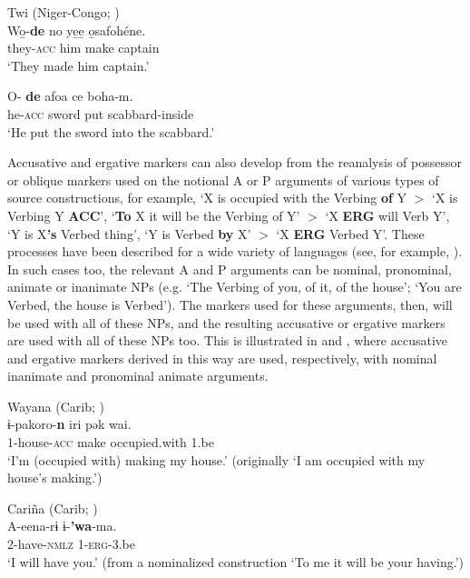 \documentclass[output=paper]{langsci/langscibook}
\begin{document}
\ea\label{twi}
Twi (Niger-Congo; )\\
\ea
\gll Wo̱-\textbf{{de}} no ye̱e̱ o̱safohéne.\\
they-\textsc{acc} him make captain\\
\glt `They made him captain.' 

\ex
\gll O-\textbf{{ de}} afoa ce boha-m.\\
he-\textsc{acc} sword put scabbard-inside\\
\glt `He put the sword into the scabbard.' 

\z
\z



Accusative and ergative markers  can  also develop from the
  reanalysis of possessor or oblique markers used on the notional A or
  P arguments of various types of source constructions, for example,
  `X is occupied with the Verbing  {\bf of} Y $>$ `X
        is Verbing Y {\bf ACC}', `{\bf To} X it will be the Verbing
        of Y' $>$ `X {\bf ERG} 
        will Verb Y',  `Y is X{\bf 's} Verbed thing', `Y is
        Verbed {\bf by} X'
        $>$ `X {\bf ERG} Verbed Y'. These processes have been described for
        a wide variety of languages (see, for example,
     \citealt{HarrisCampbell1995,Bubenik1998,Gildea1998,Creissels2008}). In such cases
        too,  the relevant A and P arguments can be nominal,
        pronominal, animate or inanimate NPs (e.g. `The Verbing of
        you, of it, of the house'; `You are Verbed, the house is
        Verbed'). The  markers used for these arguments, then,  will
        be used with all of these NPs, and the resulting accusative or
        ergative markers are used with all of these NPs too. This is
        illustrated in  and , where accusative and
        ergative markers derived in this way are used, respectively,
        with nominal inanimate and pronominal animate arguments.

\ea\label{wayana}
Wayana (Carib;  )\\
\gll ​ɨ-pakoro-\textbf{{n}} iri pək wai.\\
1-house-\textsc{acc} make occupied.with 1.be\\
\glt `I'm (occupied with) making my house.' (originally `I am occupied with my house's making.')

\z

\ea\label{carina}
Cari\~na (Carib;  )\\
\gll A-eena-r​ɨ ​ɨ-\textbf{{'wa}}-ma.\\
2-have-\textsc{nmlz} 1-\textsc{erg}-3.be\\
\glt `I will have you.' (from a nominalized construction `To me it will be your having.')
\end{document}

